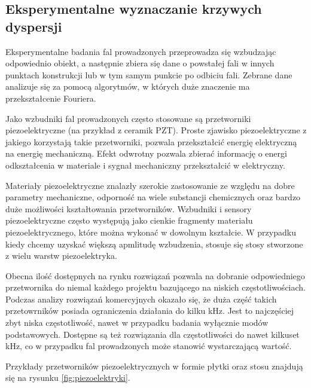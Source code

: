 \subsection{Eksperymentalne wyznaczanie krzywych dyspersji}

Eksperymentalne badania fal prowadzonych przeprowadza się wzbudzając odpowiednio obiekt, a następnie zbiera się dane o powstałej fali w innych punktach konstrukcji lub w tym samym punkcie po odbiciu fali. Zebrane dane analizuje się za pomocą algorytmów, w których duże znaczenie ma przekształcenie Fouriera.

Jako wzbudniki fal prowadzonych często stosowane są przetworniki piezoelektryczne (na przykład z ceramik PZT). Proste zjawisko piezoelektryczne z jakiego korzystają takie przetworniki, pozwala przekształcić energię elektryczną na energię mechaniczną. Efekt odwrotny pozwala zbierać informację o energi odkształcenia w materiale i sygnał mechaniczny przekształcić w elektryczny. 

Materiały piezoelektryczne znalazły szerokie zastosowanie ze względu na dobre parametry mechaniczne, odporność na wiele substancji chemicznych oraz bardzo duże możliwości kształtowania przetworników. Wzbudniki i sensory piezoelektryczne często występują jako cienkie fragmenty materiału piezoelektrycznego, które można wykonać w dowolnym kształcie. W przypadku kiedy chcemy uzyskać większą apmlitudę wzbudzenia, stosuje się stosy stworzone z wielu warstw piezoelektryka.

Obecna ilość dostępnych na rynku rozwiązań pozwala na dobranie odpowiedniego przetwornika do niemal każdego projektu bazującego na niskich częstotliwościach. Podczas analizy rozwiązań komercyjnych okazało się, że duża część takich przetowrników posiada ograniczenia działania do kilku kHz. Jest to najczęściej zbyt niska częstotliwość, nawet w przypadku badania wyłącznie modów podstawowych. Dostępne są też rozwiązania dla częstotliwości do nawet kilkuset kHz, co w przypadku fal prowadzonych może stanowić wystarczającą wartość.

Przykłady przetworników piezoelektrycznych w formie płytki oraz stosu znajdują się na rysunku \ref{fig:piezoelektryki}.

